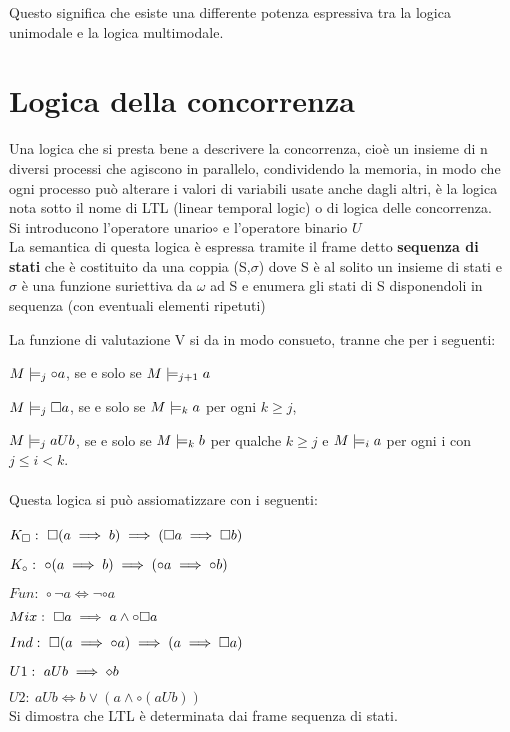 Questo significa che esiste una differente potenza espressiva tra
la logica unimodale e la logica multimodale.


\section{Logica della concorrenza}

Una logica che si presta bene a descrivere la concorrenza, cioè un
insieme di n diversi processi che agiscono in parallelo, condividendo
la memoria, in modo che ogni processo può alterare i valori di variabili
usate anche dagli altri, è la logica nota sotto il nome di LTL (linear
temporal logic) o di logica delle concorrenza.\\
Si introducono l'operatore unario$\circ$ e l'operatore binario $U$\\
La semantica di questa logica è espressa tramite il frame detto \textbf{sequenza
di stati} che è costituito da una coppia (S,$\sigma$) dove S è al
solito un insieme di stati e $\sigma$ è una funzione suriettiva da
$\omega$ ad S e enumera gli stati di S disponendoli in sequenza (con
eventuali elementi ripetuti)

La funzione di valutazione V si da in modo consueto, tranne che per
i seguenti:

$M\models_{j}\circ a$, se e solo se $M\models_{j+1}a$

$M\models_{j}\square a$, se e solo se $M\models_{k}a$ per ogni $k\geq j$,

$M\models_{j}aUb$, se e solo se $M\models_{k}b$ per qualche $k\geq j$
e $M\models_{i}a$ per ogni i con$j\leq i<k$.\\
\\
Questa logica si può assiomatizzare con i seguenti:\\
\\
$K_{\square}:\ \square(a\implies b)\implies(\square a\implies\square b)$

$K_{\circ}:\ \circ(a\implies b)\implies(\circ a\implies\circ b)$

$Fun:\ \circ\neg a\iff\neg\circ a$

$Mix:\ \square a\implies a\wedge\circ\square a$

$Ind:\ \square(a\implies\circ a)\implies(a\implies\square a)$

$U1:\ aUb\implies\diamond b$

$U2:\ aUb\iff b\vee(a\wedge\circ(aUb))$\\


Si dimostra che LTL è determinata dai frame sequenza di stati.


